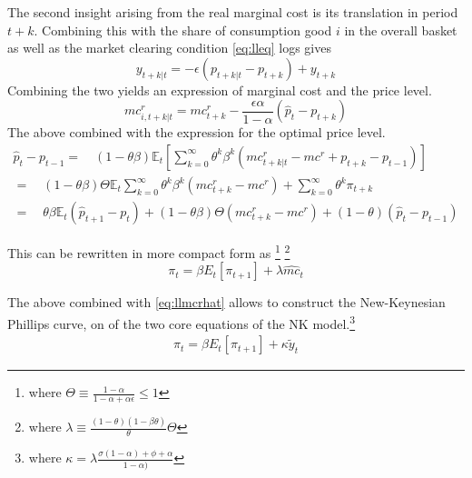 \documentclass[12pt,a4paper,english]{article} %
\newcommand{\E}{\mathbb{E}} %
\begin{document}
	The second insight arising from the real marginal cost is its translation in period $t+k$. Combining this with the share of consumption good $i$ in the overall basket as well as the market clearing condition \ref{eq:lleq} logs gives 
	\begin{equation}
		y_{t+k|t} = -\epsilon(p_{t+k|t} - p_{t+k}) + y_{t+k}
	\end{equation}
	Combining the two yields an expression of marginal cost and the price level.
	\begin{equation}
		mc_{i, t+k|t}^r = mc_{t+k}^r - \frac{\epsilon \alpha}{1 - \alpha}(\hat{p}_t - p_{t+k})
	\end{equation}
	The above combined with the expression for the optimal price level.
	\begin{equation}
		\begin{aligned}
			\hat{p}_t - p_{t-1} =
			\quad
			(1 - \theta \beta) \E_t
			\left[
			\sum_{k=0}^{\infty} \theta^k \beta^k \left( mc_{t+k|t}^r - mc^r +p_{t+k} - p_{t-1}\right)
			\right] \\			
			=
			\quad
			(1 - \theta \beta) \Theta \E_t
			\sum_{k=0}^{\infty} \theta^k \beta^k (mc_{t+k}^r - mc^r) + 
			\sum_{k=0}^{\infty} \theta^k \pi_{t+k} \\
			=
			\quad
			\theta \beta \E_t (\hat{p}_{t+1} - p_{t}) + (1 - \theta \beta) \Theta (mc_{t+k}^r - mc^r) + (1 - \theta) (\hat{p}_t - p_{t-1})
		\end{aligned}		
	\end{equation} 

	This can be rewritten in more compact form as \footnote{where $\Theta \equiv \frac{1 - \alpha}{1 - \alpha + \alpha \epsilon} \leq 1$} \footnote{	where $\lambda \equiv \frac{(1-\theta)(1-\beta\theta)}{\theta} \Theta$}
	\begin{equation}
		\pi_t = \beta E_t [\pi_{t+1}] + \lambda \hat{mc}_{t}
	\end{equation}

	The above combined with \ref{eq:llmcrhat} allows to construct the New-Keynesian Phillips curve, on of the two core equations of the NK model.\footnote{where $\kappa = \lambda \frac{\sigma (1 - \alpha) + \phi + \alpha}{1 - \alpha)}$}
	\begin{equation} \label{eq:llnkp}
		\begin{aligned}
			\pi_t = \beta E_t [\pi_{t+1}] + \kappa \tilde{y}_t
		\end{aligned}
	\end{equation}
	
\end{document}
